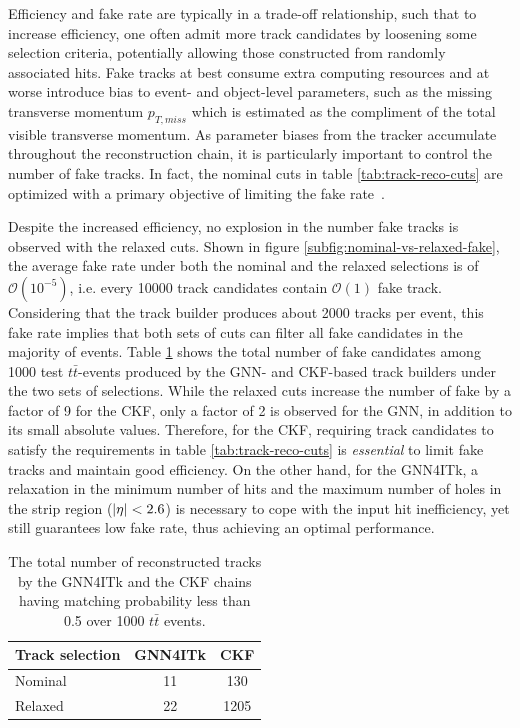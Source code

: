Efficiency and fake rate are typically in a trade-off relationship, such that to increase efficiency, one often admit more track candidates by loosening some selection criteria, potentially allowing those constructed from randomly associated hits. 
Fake tracks at best consume extra computing resources and at worse introduce bias to event- and object-level parameters, such as the missing transverse momentum $p_{T,miss}$ which is estimated as the compliment of the total visible transverse momentum. 
As parameter biases from the tracker accumulate throughout the reconstruction chain, it is particularly important to control the number of fake tracks.
In fact, the nominal cuts in table \ref{tab:track-reco-cuts} are optimized with a primary objective of limiting the fake rate~\cite{Aad_2025}.

Despite the increased efficiency, no explosion in the number fake tracks is observed with the relaxed cuts. 
Shown in figure \ref{subfig:nominal-vs-relaxed-fake}, the average fake rate under both the nominal and the relaxed selections is of $\mathcal{O}(10^{-5})$, i.e. every 10000 track candidates contain $\mathcal{O}(1)$ fake track.
Considering that the track builder produces about 2000 tracks per event, this fake rate implies that both sets of cuts can filter all fake candidates in the majority of events.
Table \ref{tab:integrated-fake} shows the total number of fake candidates among 1000 test $t\bar{t}$-events produced by the GNN- and CKF-based track builders under the two sets of selections. 
While the relaxed cuts increase the number of fake by a factor of 9 for the CKF, only a factor of 2 is observed for the GNN, in addition to its small absolute values.
Therefore, for the CKF, requiring track candidates to satisfy the requirements in table \ref{tab:track-reco-cuts} is \textit{essential} to limit fake tracks and maintain good efficiency. 
On the other hand, for the GNN4ITk, a relaxation in the minimum number of hits and the maximum number of holes in the strip region ($\abs{\eta}<2.6$) is necessary to cope with the input hit inefficiency, yet still guarantees low fake rate, thus achieving an optimal performance.

\begin{table}[h!]
    \centering
    \begin{tabular}{|l|c|c|} \hline
        Track selection & GNN4ITk & CKF \\ \hline
        Nominal & 11 & 130 \\
        Relaxed & 22 & 1205 \\ \hline
    \end{tabular}
    \caption{The total number of reconstructed tracks by the GNN4ITk and the CKF chains having matching probability less than 0.5 over 1000 $t\bar{t}$ events.}
    \label{tab:integrated-fake}
\end{table}

